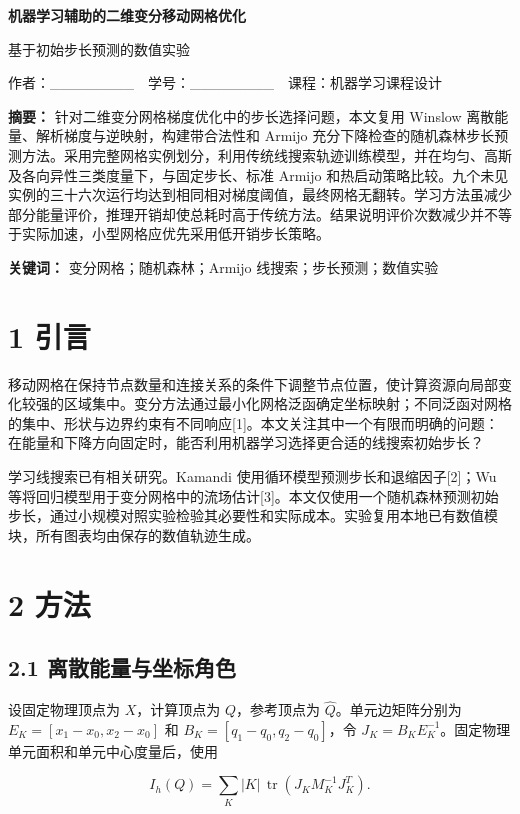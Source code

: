 \documentclass[UTF8,a4paper,zihao=5,fontset=fandol]{ctexart}
\begin{document}
\begin{center}{\LARGE\bfseries 机器学习辅助的二维变分移动网格优化}\end{center}

基于初始步长预测的数值实验


作者：\_\_\_\_\_\_\_\_　学号：\_\_\_\_\_\_\_\_　课程：机器学习课程设计


\textbf{摘要：} 针对二维变分网格梯度优化中的步长选择问题，本文复用 Winslow 离散能量、解析梯度与逆映射，构建带合法性和 Armijo 充分下降检查的随机森林步长预测方法。采用完整网格实例划分，利用传统线搜索轨迹训练模型，并在均匀、高斯及各向异性三类度量下，与固定步长、标准 Armijo 和热启动策略比较。九个未见实例的三十六次运行均达到相同相对梯度阈值，最终网格无翻转。学习方法虽减少部分能量评价，推理开销却使总耗时高于传统方法。结果说明评价次数减少并不等于实际加速，小型网格应优先采用低开销步长策略。


\textbf{关键词：} 变分网格；随机森林；Armijo 线搜索；步长预测；数值实验


\section*{1 引言}

移动网格在保持节点数量和连接关系的条件下调整节点位置，使计算资源向局部变化较强的区域集中。变分方法通过最小化网格泛函确定坐标映射；不同泛函对网格的集中、形状与边界约束有不同响应[1]。本文关注其中一个有限而明确的问题：在能量和下降方向固定时，能否利用机器学习选择更合适的线搜索初始步长？


学习线搜索已有相关研究。Kamandi 使用循环模型预测步长和退缩因子[2]；Wu 等将回归模型用于变分网格中的流场估计[3]。本文仅使用一个随机森林预测初始步长，通过小规模对照实验检验其必要性和实际成本。实验复用本地已有数值模块，所有图表均由保存的数值轨迹生成。


\section*{2 方法}

\subsection*{2.1 离散能量与坐标角色}

设固定物理顶点为 $X$，计算顶点为 $Q$，参考顶点为 $\widehat Q$。单元边矩阵分别为 $E_K=[x_1-x_0,x_2-x_0]$ 和 $B_K=[q_1-q_0,q_2-q_0]$，令 $J_K=B_KE_K^{-1}$。固定物理单元面积和单元中心度量后，使用


\[
I_h(Q)=\sum_K |K|\,\operatorname{tr}(J_K M_K^{-1}J_K^T).
\]
\end{document}
